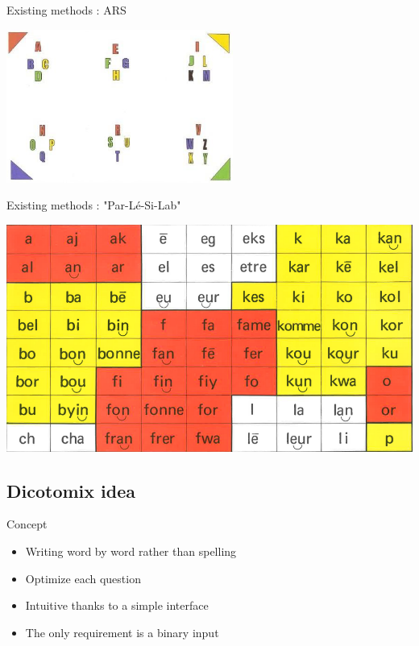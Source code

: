 \documentclass[notes]{beamer}
\begin{document}
\begin{frame}{Existing methods : ARS}
	\begin{center}
		\includegraphics[scale=0.9]{tableau_lettres_transparent}
	\end{center}
\end{frame}

\begin{frame}{Existing methods : "Par-Lé-Si-Lab"}
	\begin{center}
		\includegraphics[scale=0.3]{parler_syllabes}
	\end{center}
\end{frame}

\subsection{Dicotomix idea}
\begin{frame}{Concept}
	\begin{center}
		\begin{itemize}
			\item Writing word by word rather than spelling
			\item Optimize each question
			\item Intuitive thanks to a simple interface
			\item The only requirement is a binary input
		\end{itemize}
	\end{center}
\end{frame}
\end{document}
